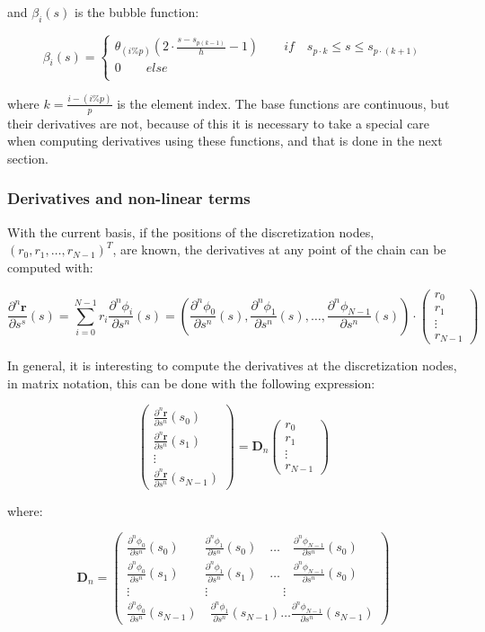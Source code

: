 \documentclass[10pt] {article}
\newcommand{\ba}{\begin{array}}
\newcommand{\ea}{\end{array}}
\newcommand{\pa}{\partial}
\begin{document}
\vspace{1cm}

and $\beta_i(s)$ is the bubble function:

$$\beta_i(s) = \left\{ \ba{l} 
\theta_{(i\% p)}(2\cdot\frac{s-s_{p(k-1)}}{h}-1)\quad\quad if\quad s_{p\cdot k}\leq s\leq s_{p\cdot (k+1)} \\
0\quad\quad else\\
\ea \right.$$

where $k = \frac{i-(i\%p)}{p}$ is the element index. The base functions are continuous, but their derivatives are not, because of this it is necessary to take a special care when computing derivatives using these functions, and that is done in the next section.\\

\subsubsection{Derivatives and non-linear terms}

With the current basis, if the positions of the discretization nodes, $(r_0, r_1, \dots, r_{N-1})^T$, are known, the derivatives at any point of the chain can be computed with:

$$\frac{\pa^n\mathbf{r}}{\pa s^s}(s)=\sum_{i=0}^{N-1} r_i \frac{\pa^n\phi_i}{\pa s^n}(s)= \left( \frac{\pa^n\phi_0}{\pa s^n}(s), \frac{\pa^n\phi_1}{\pa s^n}(s), \dots , \frac{\pa^n\phi_{N-1}}{\pa s^n}(s) \right)\cdot \left(\ba{c} r_0 \\ r_1 \\ \vdots \\ r_{N-1} \ea\right)$$

In general, it is interesting to compute the derivatives at the discretization nodes, in matrix notation, this can be done with the following expression:

$$\displaystyle
 \left(\ba{c} \frac{\pa^n\mathbf{r}}{\pa s^n}(s_0) \\ \frac{\pa^n\mathbf{r}}{\pa s^n}(s_1) \\ \vdots \\ \frac{\pa^n\mathbf{r}}{\pa s^n}(s_{N-1}) \ea\right) =  \mathbf{D}_n \left(\ba{c} r_0 \\ r_1 \\ \vdots \\ r_{N-1} \ea\right)$$
 
where:

$$\displaystyle
\mathbf{D}_n = \left(\ba{c} \frac{\pa^n\phi_0}{\pa s^n}(s_0)\quad\quad \frac{\pa^n\phi_1}{\pa s^n}(s_0)\quad \dots \quad \frac{\pa^n\phi_{N-1}}{\pa s^n}(s_0) \\ \frac{\pa^n\phi_0}{\pa s^n}(s_1)\quad\quad \frac{\pa^n\phi_1}{\pa s^n}(s_1)\quad \dots\quad \frac{\pa^n\phi_{N-1}}{\pa s^n}(s_0) \\ \vdots\quad\quad\quad\quad\quad\quad\vdots\quad\quad\quad\quad\quad\quad\vdots\\ \frac{\pa^n\phi_0}{\pa s^n}(s_{N-1})\quad \frac{\pa^n\phi_1}{\pa s^n}(s_{N-1}) \dots \frac{\pa^n\phi_{N-1}}{\pa s^n}(s_{N-1}) \ea\right)$$
\end{document}
